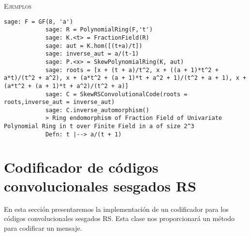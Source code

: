 \begin{description}[leftmargin=1em, font=\normalfont\ttfamily, style=nextline]
\begin{description}[font=\ttfamily,style=nextline]
        \textsc{Ejemplos}

        \begin{lstlisting}[gobble=12]
            sage: F = GF(8, 'a')
            sage: R = PolynomialRing(F,'t')
            sage: K.<t> = FractionField(R)
            sage: aut = K.hom([(t+a)/t])
            sage: inverse_aut = a/(t-1)
            sage: P.<x> = SkewPolynomialRing(K, aut)
            sage: roots = [x + (t + a)/t^2, x + ((a + 1)*t^2 + a*t)/(t^2 + a^2), x + (a*t^2 + (a + 1)*t + a^2 + 1)/(t^2 + a + 1), x + (a*t^2 + (a + 1)*t + a^2)/(t^2 + a)]
            sage: C = SkewRSConvolutionalCode(roots = roots,inverse_aut = inverse_aut) 
            sage: C.inverse_automorphism()
            > Ring endomorphism of Fraction Field of Univariate Polynomial Ring in t over Finite Field in a of size 2^3
            Defn: t |--> a/(t + 1)
        \end{lstlisting} 
    \end{description}
\end{description}

\section{Codificador de códigos convolucionales sesgados RS}

En esta sección presentaremos la implementación de un codificador para los códigos convolucionales sesgados RS. Esta clase nos proporcionará un método para codificar un mensaje.

